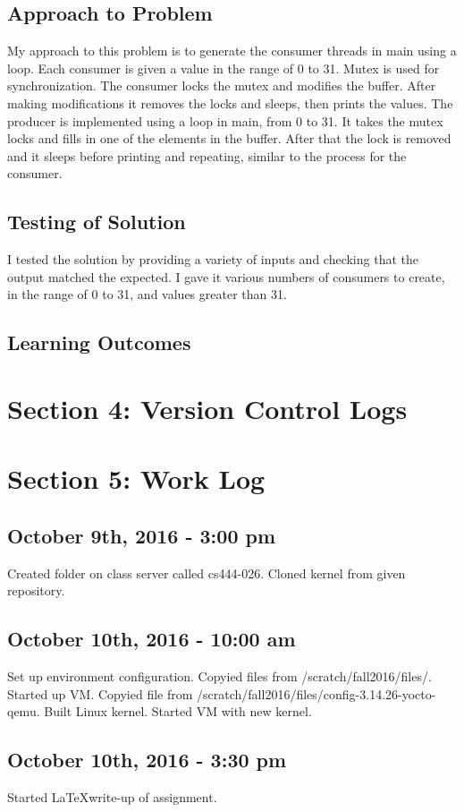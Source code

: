 \documentclass[letterpaper,10pt]{article}
\begin{document}
\subsection{Approach to Problem}
My approach to this problem is to generate the consumer threads in main using a
loop. Each consumer is given a value in the range of 0 to 31. Mutex is used for
synchronization. The consumer locks the mutex and modifies the buffer. After
making modifications it removes the locks and sleeps, then prints the values.
The producer is implemented using a loop in main, from 0 to 31. It takes the
mutex locks and fills in one of the elements in the buffer. After that the lock
is removed and it sleeps before printing and repeating, similar to the process
for the consumer.
\subsection{Testing of Solution}
I tested the solution by providing a variety of inputs and checking that the
output matched the expected. I gave it various numbers of consumers to create,
in the range of 0 to 31, and values greater than 31.
\subsection{Learning Outcomes}

\section{Section 4: Version Control Logs}

\section{Section 5: Work Log}
\subsection{October 9th, 2016 - 3:00 pm}
Created folder on class server called cs444-026.
Cloned kernel from given repository.
\subsection{October 10th, 2016 - 10:00 am}
Set up environment configuration.
Copyied files from /scratch/fall2016/files/.
Started up VM.
Copyied file from /scratch/fall2016/files/config-3.14.26-yocto-qemu.
Built Linux kernel.
Started VM with new kernel.
\subsection{October 10th, 2016 - 3:30 pm}
Started \LaTeX write-up of assignment.
\end{document}
